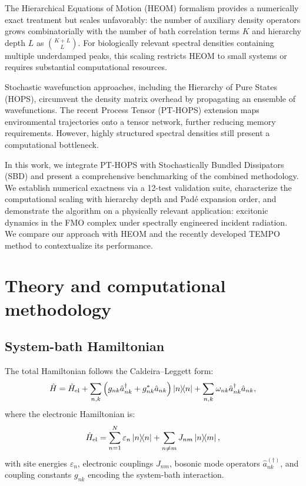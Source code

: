 \documentclass[journal=jctc,manuscript=article]{achemso}
\begin{document}
The Hierarchical Equations of Motion (HEOM) formalism\cite{Tanimura1989,Ishizaki2009a} provides a numerically exact treatment but scales unfavorably: the number of auxiliary density operators grows combinatorially with the number of bath correlation terms $K$ and hierarchy depth $L$ as $\binom{K+L}{L}$. For biologically relevant spectral densities containing multiple underdamped peaks, this scaling restricts HEOM to small systems or requires substantial computational resources.\cite{Moix2011}

Stochastic wavefunction approaches, including the Hierarchy of Pure States (HOPS),\cite{Suess2014} circumvent the density matrix overhead by propagating an ensemble of wavefunctions. The recent Process Tensor (PT-HOPS) extension\cite{Citty2024a} maps environmental trajectories onto a tensor network, further reducing memory requirements. However, highly structured spectral densities still present a computational bottleneck.

In this work, we integrate PT-HOPS with Stochastically Bundled Dissipators (SBD)\cite{Citty2024a} and present a comprehensive benchmarking of the combined methodology. We establish numerical exactness via a 12-test validation suite, characterize the computational scaling with hierarchy depth and Padé expansion order, and demonstrate the algorithm on a physically relevant application: excitonic dynamics in the FMO complex under spectrally engineered incident radiation. We compare our approach with HEOM\cite{Ishizaki2009a} and the recently developed TEMPO method\cite{Strathearn2018} to contextualize its performance.

\section{Theory and computational methodology}

\subsection{System-bath Hamiltonian}
The total Hamiltonian follows the Caldeira--Leggett form:\cite{Tanimura1989}
\begin{equation}
\hat{H} = \hat{H}_{\mathrm{el}} + \sum_{n,k}\left(g_{nk}\hat{a}_{nk}^\dagger + g_{nk}^*\hat{a}_{nk}\right)\dyad{n} + \sum_{n,k}\omega_{nk}\hat{a}_{nk}^\dagger\hat{a}_{nk},
\end{equation}
where the electronic Hamiltonian is:
\begin{equation}
\hat{H}_{\mathrm{el}} = \sum_{n=1}^{N} \varepsilon_n \dyad{n} + \sum_{n \neq m} J_{nm} \dyad{n}{m},
\label{eq:excitonic_hamiltonian}
\end{equation}
with site energies $\varepsilon_n$, electronic couplings $J_{nm}$, bosonic mode operators $\hat{a}_{nk}^{(\dagger)}$, and coupling constants $g_{nk}$ encoding the system-bath interaction.
\end{document}
